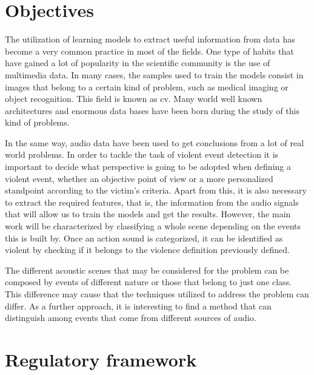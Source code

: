 	
\section{Objectives}

	The utilization of learning models to extract useful information from data has become a very common practice in most of the fields. One type of habits that have gained a lot of popularity in the scientific community is the use of multimedia data. In many cases, the samples used to train the models consist in images that belong to a certain kind of problem, such as medical imaging or object recognition. This field is known as \acrfull{cv}. Many world well known architectures and enormous data bases have been born during the study of this kind of problems.
	
	In the same way, audio data have been used to get conclusions from a lot of real world problems. In order to tackle the task of violent event detection it is important to decide what perspective is going to be adopted when defining a violent event, whether an objective point of view or a more personalized standpoint according to the victim's criteria. Apart from this, it is also necessary to extract the required features, that is, the information from the audio signals that will allow us to train the models and get the results. However, the main work will be characterized by classifying a whole scene depending on the events this is built by. Once an action sound is categorized, it can be identified as violent by checking if it belongs to the violence definition previously defined. 
		
	The different acoustic scenes that may be considered for the problem can be composed by events of different nature or those that belong to just one class. This difference may cause that the techniques utilized to address the problem can differ. As a further approach, it is interesting to find a method that can distinguish among events that come from different sources of audio.
	
\section{Regulatory framework}

